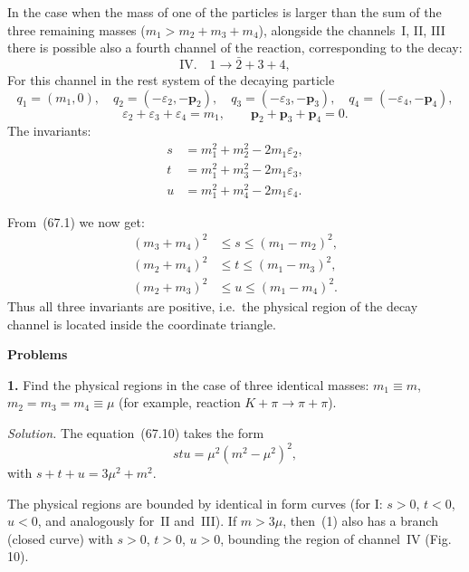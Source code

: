 In the case when the mass of one of the particles is larger than the sum of the three remaining masses ($m_1 > m_2 + m_3 + m_4$), alongside the channels~I, II, III there is possible also a fourth channel of the reaction, corresponding to the decay:
\begin{equation}
\text{IV.}\quad 1 \to \bar{2} + 3 + 4,
\tag{67.11}
\end{equation}
For this channel in the rest system of the decaying particle
\[
q_1 = (m_1, 0),\quad q_2 = (-\varepsilon_2, -\mathbf{p}_2),\quad q_3 = (-\varepsilon_3, -\mathbf{p}_3),\quad q_4 = (-\varepsilon_4, -\mathbf{p}_4),
\]
\[
\varepsilon_2 + \varepsilon_3 + \varepsilon_4 = m_1,\qquad \mathbf{p}_2 + \mathbf{p}_3 + \mathbf{p}_4 = 0.
\]
The invariants:
\begin{equation}
\begin{aligned}
s &= m^2_1 + m^2_2 - 2m_1\varepsilon_2,\\[3pt]
t &= m^2_1 + m^2_3 - 2m_1\varepsilon_3,\\[3pt]
u &= m^2_1 + m^2_4 - 2m_1\varepsilon_4.
\end{aligned}
\tag{67.12}
\end{equation}

From~(67.1) we now get:
\begin{equation}
\begin{aligned}
(m_3 + m_4)^2 &\leqslant s \leqslant (m_1 - m_2)^2,\\[3pt]
(m_2 + m_4)^2 &\leqslant t \leqslant (m_1 - m_3)^2,\\[3pt]
(m_2 + m_3)^2 &\leqslant u \leqslant (m_1 - m_4)^2.
\end{aligned}
\tag{67.13}
\end{equation}
Thus all three invariants are positive, i.e.\ the physical region of the decay channel is located inside the coordinate triangle.

\bigskip
\begin{center}\textbf{Problems}\end{center}
\smallskip
\textbf{1.} Find the physical regions in the case of three identical masses: $m_1 \equiv m$, $m_2 = m_3 = m_4 \equiv \mu$ (for example, reaction $K + \pi \to \pi + \pi$).

\textit{Solution.} The equation~(67.10) takes the form
\[
stu = \mu^2(m^2 - \mu^2)^2,\tag{1}
\]
with $s + t + u = 3\mu^2 + m^2$.

The physical regions are bounded by identical in form curves (for I: $s > 0$, $t < 0$, $u < 0$, and analogously for~II and~III). If $m > 3\mu$, then~(1) also has a branch (closed curve) with $s > 0$, $t > 0$, $u > 0$, bounding the region of channel~IV (Fig.\,10).

